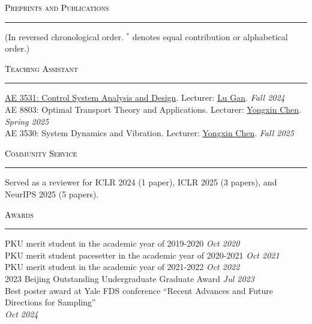 \documentclass{resume} %
\renewenvironment{rSection}[1]{
\sectionskip
\textcolor{black}{\textsc{#1}}
\sectionlineskip
\hrule
\begin{list}{}{
\setlength{\leftmargin}{1.5em}
}
\item[]
}{
\end{list}
}
\begin{document}
\begin{rSection}{Preprints and Publications} 
    (In reversed chronological order. $^*$ denotes equal contribution or alphabetical order.)
    \itemsep -2pt
    \nocite{*}\leavevmode\printbibliography[heading=none]
\end{rSection}



\begin{rSection}{Teaching Assistant} \itemsep -2pt
\href{https://ae3531a.notion.site/Course-Syllabus-Fall-2024-049faa69bedb4dd2b9b353318f52d5d6}{AE 3531: Control System Analysis and Design}. 
Lecturer: \href{https://research.gatech.edu/people/lu-gan}{Lu Gan}.
\hfill {\em Fall 2024} \\
AE 8803: Optimal Transport Theory and Applications. 
Lecturer: \href{https://yongxin.ae.gatech.edu/}{Yongxin Chen}.
\hfill {\em Spring 2025} \\
AE 3530: System Dynamics and Vibration.
Lecturer: \href{https://yongxin.ae.gatech.edu/}{Yongxin Chen}.
\hfill {\em Fall 2025} \\
\end{rSection}


\begin{rSection}{Community Service} \itemsep -2pt
    Served as a reviewer for ICLR 2024 (1 paper), ICLR 2025 (3 papers), and NeurIPS 2025 (5 papers).
\end{rSection}


\newpage


\begin{rSection}{Awards} \itemsep -2pt
    PKU merit student in the academic year of 2019-2020 \hfill {\em Oct 2020} \\
    PKU merit student pacesetter in the academic year of 2020-2021 \hfill {\em Oct 2021} \\
    PKU merit student in the academic year of 2021-2022 \hfill {\em Oct 2022} \\
    2023 Beijing Outstanding Undergraduate Graduate Award \hfill {\em Jul 2023} \\
    Best poster award at Yale FDS conference ``Recent Advances and Future Directions for Sampling'' \\
    \phantom{.} \hfill {\em Oct 2024} \\
\end{rSection}
\end{document}
